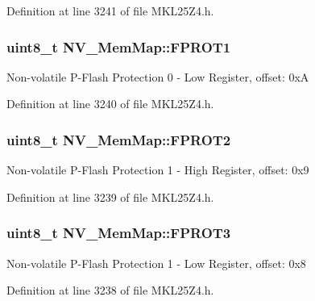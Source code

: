 Definition at line 3241 of file M\+K\+L25\+Z4.\+h.

\subsubsection[{\texorpdfstring{F\+P\+R\+O\+T1}{FPROT1}}]{\setlength{\rightskip}{0pt plus 5cm}uint8\+\_\+t N\+V\+\_\+\+Mem\+Map\+::\+F\+P\+R\+O\+T1}\hypertarget{struct_n_v___mem_map_a87204afdff32b371c03caafdf5a07b69}{}\label{struct_n_v___mem_map_a87204afdff32b371c03caafdf5a07b69}
Non-\/volatile P-\/\+Flash Protection 0 -\/ Low Register, offset\+: 0xA 

Definition at line 3240 of file M\+K\+L25\+Z4.\+h.

\subsubsection[{\texorpdfstring{F\+P\+R\+O\+T2}{FPROT2}}]{\setlength{\rightskip}{0pt plus 5cm}uint8\+\_\+t N\+V\+\_\+\+Mem\+Map\+::\+F\+P\+R\+O\+T2}\hypertarget{struct_n_v___mem_map_aace11e44cee29095fe7c0bf683039f57}{}\label{struct_n_v___mem_map_aace11e44cee29095fe7c0bf683039f57}
Non-\/volatile P-\/\+Flash Protection 1 -\/ High Register, offset\+: 0x9 

Definition at line 3239 of file M\+K\+L25\+Z4.\+h.

\subsubsection[{\texorpdfstring{F\+P\+R\+O\+T3}{FPROT3}}]{\setlength{\rightskip}{0pt plus 5cm}uint8\+\_\+t N\+V\+\_\+\+Mem\+Map\+::\+F\+P\+R\+O\+T3}\hypertarget{struct_n_v___mem_map_a944089b14b23cff0b4f8a16e13f8b9d6}{}\label{struct_n_v___mem_map_a944089b14b23cff0b4f8a16e13f8b9d6}
Non-\/volatile P-\/\+Flash Protection 1 -\/ Low Register, offset\+: 0x8 

Definition at line 3238 of file M\+K\+L25\+Z4.\+h.

